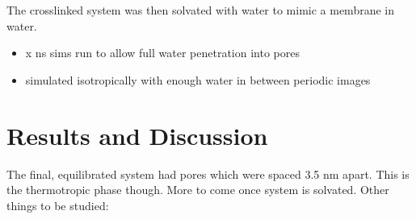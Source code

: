 \documentclass{article}
\begin{document}
\noindent The crosslinked system was then solvated with water to mimic a membrane in water.
\begin{itemize}
	\item x ns sims run to allow full water penetration into pores
	\item simulated isotropically with enough water in between periodic images
\end{itemize}  
 
\section{Results and Discussion}

The final, equilibrated system had pores which were spaced 3.5 nm apart. This is the thermotropic phase though. More to come once system is solvated. 
Other things to be studied:
\end{document}
